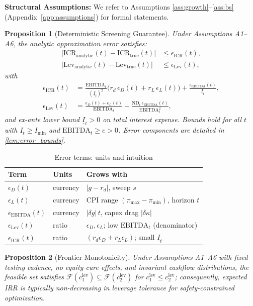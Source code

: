 \documentclass[11pt,a4paper]{article}
\newcommand{\ND}{\mathrm{ND}} %
\newcommand{\EBITDA}{\mathrm{EBITDA}}
\newcommand{\ICR}{\mathrm{ICR}}
\newcommand{\Lev}{\mathrm{Lev}}
\newcommand{\pimin}{\pi_{\min}}
\newcommand{\pimax}{\pi_{\max}}
\theoremstyle{plain}
\newtheorem{proposition}{Proposition}
\theoremstyle{definition}
\newcommand{\cref}[1]{\ref{#1}}
\begin{document}
\textbf{Structural Assumptions:} We refer to Assumptions \ref{ass:growth}--\ref{ass:bs} (Appendix~\ref{app:assumptions}) for formal statements.

\begin{proposition}[Deterministic Screening Guarantee]\label{prop:screening}
Under Assumptions A1--A6, the analytic approximation error satisfies:
\begin{align}
\bigl|\ICR_{\text{analytic}}(t) - \ICR_{\text{true}}(t)\bigr| &\le \epsilon_{\text{ICR}}(t), \\
\bigl|\Lev_{\text{analytic}}(t) - \Lev_{\text{true}}(t)\bigr| &\le \epsilon_{\text{Lev}}(t),
\end{align}
with
\begin{align}
\epsilon_{\text{ICR}}(t) &= \frac{\EBITDA_t}{(\underline{I}_t)^2}\bigl(r_d\,\epsilon_D(t)+r_L\,\epsilon_L(t)\bigr) + \frac{\epsilon_{\text{EBITDA}}(t)}{\underline{I}_t}, \\
\epsilon_{\text{Lev}}(t) &= \frac{\epsilon_D(t)+\epsilon_L(t)}{\EBITDA_t} + \frac{\ND_t\,\epsilon_{\text{EBITDA}}(t)}{\EBITDA_t^2},
\end{align}
and ex-ante lower bound $\underline{I}_t>0$ on total interest expense. Bounds hold for all $t$ with $I_t \geq I_{\min}$ and $\EBITDA_t \geq e > 0$. Error components are detailed in \cref{lem:error_bounds}.
\end{proposition}

\begin{table}[H]
\centering
\caption{Error terms: units and intuition}
\begin{tabular}{lll}
\toprule
Term & Units & Grows with \\
\midrule
$\epsilon_D(t)$ & currency & $|g-r_d|$, sweep $s$ \\
$\epsilon_L(t)$ & currency & CPI range $(\pimax-\pimin)$, horizon $t$ \\
$\epsilon_{\text{EBITDA}}(t)$ & currency & $|\delta g|\,t$, capex drag $|\delta\kappa|$ \\
$\epsilon_{\text{Lev}}(t)$ & ratio & $\epsilon_D,\epsilon_L$; low $\EBITDA_t$ (denominator) \\
$\epsilon_{\text{ICR}}(t)$ & ratio & $(r_d\epsilon_D+r_L\epsilon_L)$; small $\underline{I}_t$ \\
\bottomrule
\end{tabular}
\end{table}

\begin{proposition}[Frontier Monotonicity]\label{prop:frontier}
Under Assumptions A1--A6 with fixed testing cadence, no equity-cure effects, and invariant cashflow distributions, the feasible set satisfies $\mathcal{F}(c^{\text{lev}}_1)\subseteq \mathcal{F}(c^{\text{lev}}_2)$ for $c^{\text{lev}}_1\le c^{\text{lev}}_2$; consequently, expected IRR is typically non-decreasing in leverage tolerance for safety-constrained optimization.
\end{proposition}
\end{document}
